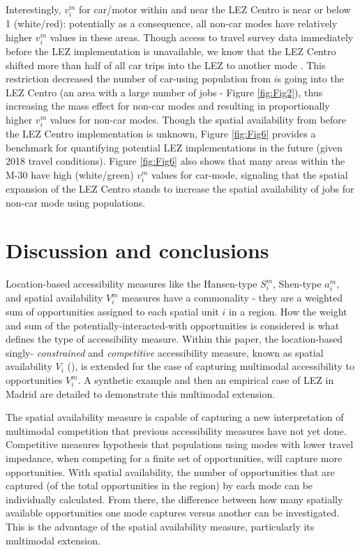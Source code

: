 \documentclass[]{trbunofficial}
\begin{document}
Interestingly, \(v_i^m\) for car/motor within and near the LEZ Centro is
near or below 1 (white/red): potentially as a consequence, all non-car
modes have relatively higher \(v_i^m\) values in these areas. Though
access to travel survey data immediately before the LEZ implementation
is unavailable, we know that the LEZ Centro shifted more than half of
all car trips into the LEZ to another mode
\citep{tarrinoortizAnalyzingImpactLow2022}. This restriction decreased
the number of car-using population from \(i\)s going into the LEZ Centro
(an area with a large number of jobs - Figure \ref{fig:Fig2}), thus
increasing the mass effect for non-car modes and resulting in
proportionally higher \(v_i^m\) values for non-car modes. Though the
spatial availability from before the LEZ Centro implementation is
unknown, Figure \ref{fig:Fig6} provides a benchmark for quantifying
potential LEZ implementations in the future (given 2018 travel
conditions). Figure \ref{fig:Fig6} also shows that many areas within the
M-30 have high (white/green) \(v_i^m\) values for car-mode, signaling
that the spatial expansion of the LEZ Centro stands to increase the
spatial availability of jobs for non-car mode using populations.

\hypertarget{discussion-and-conclusions}{%
\section{Discussion and conclusions}\label{discussion-and-conclusions}}

Location-based accessibility measures like the Hansen-type \(S_i^m\),
Shen-type \(a_i^m\), and spatial availability \(V_i^m\) measures have a
commonality - they are a weighted sum of opportunities assigned to each
spatial unit \(i\) in a region. How the weight and sum of the
potentially-interacted-with opportunities is considered is what defines
the type of accessibility measure. Within this paper, the location-based
singly- \emph{constrained} and \emph{competitive} accessibility measure,
known as spatial availability \(V_i\)
(\citet{soukhovIntroducingSpatialAvailability2023}), is extended for the
case of capturing multimodal accessibility to opportunities \(V_i^m\). A
synthetic example and then an empirical case of LEZ in Madrid are
detailed to demonstrate this multimodal extension.

The spatial availability measure is capable of capturing a new
interpretation of multimodal competition that previous accessibility
measures have not yet done. Competitive measures hypothesis that
populations using modes with lower travel impedance, when competing for
a finite set of opportunities, will capture more opportunities. With
spatial availability, the number of opportunities that are captured (of
the total opportunities in the region) by each mode can be individually
calculated. From there, the difference between how many spatially
available opportunities one mode captures versus another can be
investigated. This is the advantage of the spatial availability measure,
particularly its multimodal extension.
\end{document}

